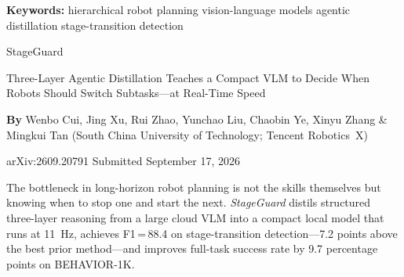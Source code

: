 \documentclass[10pt,twocolumn]{article}
\begin{document}
\setlength{\parindent}{0pt}
\setlength{\parskip}{4pt}

{\small\color{keywordgray}\textbf{Keywords:}
  hierarchical robot planning \textbullet{}
  vision-language models \textbullet{}
  agentic distillation \textbullet{}
  stage-transition detection}\par\vspace{4pt}

{\LARGE\bfseries\raggedright
  StageGuard}\par\vspace{4pt}

{\large\itshape\raggedright
  Three-Layer Agentic Distillation Teaches a Compact VLM to Decide
  When Robots Should Switch Subtasks---at Real-Time Speed}\par\vspace{6pt}

{\small\textbf{By} Wenbo Cui, Jing Xu, Rui Zhao, Yunchao Liu, Chaobin Ye,
  Xinyu Zhang \& Mingkui Tan (South China University of Technology;
  Tencent Robotics~X)}\par\vspace{2pt}

{\small\color{keywordgray}arXiv:2609.20791 \textbullet{} Submitted September 17, 2026}
\par\vspace{2pt}\noindent{\color{rulered}\rule{\columnwidth}{0.6pt}}\vspace{6pt}

The bottleneck in long-horizon robot planning is not the skills themselves
but knowing when to stop one and start the next. \textit{StageGuard} distils
structured three-layer reasoning from a large cloud VLM into a compact local
model that runs at 11~Hz, achieves F1\,=\,88.4 on stage-transition
detection---7.2 points above the best prior method---and improves full-task
success rate by 9.7 percentage points on BEHAVIOR-1K.
\end{document}
